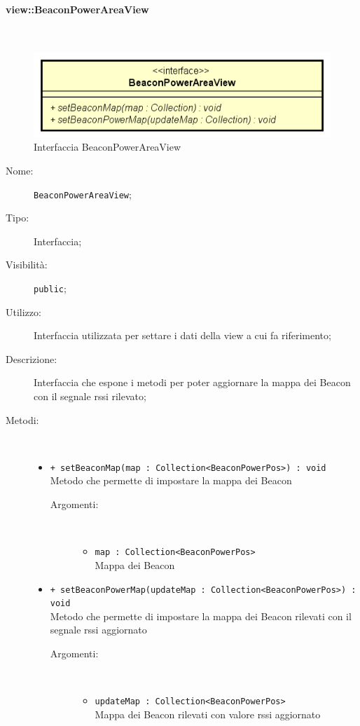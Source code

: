 \documentclass[../DefinizioneDiProdotto.tex]{subfiles}
\begin{document}
\paragraph{view::BeaconPowerAreaView}
\
\begin{figure}[H]
	\centering
	\includegraphics[width=\maxwidth]{img/BeaconPowerAreaView.png}
	\caption{Interfaccia BeaconPowerAreaView}\label{fig:view::BeaconPowerAreaView} 
\end{figure}
\begin{description}
	\item[Nome:] \texttt{BeaconPowerAreaView};
	\item[Tipo:] Interfaccia;
	\item[Visibilità:] \texttt{public};
	\item[Utilizzo:] Interfaccia utilizzata per settare i dati della view a cui fa riferimento;
	\item[Descrizione:] Interfaccia che espone i metodi per poter aggiornare la mappa dei Beacon con il segnale rssi rilevato;
	\item[Metodi:] \
	\begin{itemize}
		\item \texttt{+ setBeaconMap(map : Collection<BeaconPowerPos>) : void}\\
		Metodo che permette di impostare la mappa dei Beacon
		\begin{description}
			\item[Argomenti:] \
			\begin{itemize}
				\item \texttt{map : Collection<BeaconPowerPos>}\\
				Mappa dei Beacon\end{itemize}
		\end{description}
		\item \texttt{+ setBeaconPowerMap(updateMap : Collection<BeaconPowerPos>) : void}\\
		Metodo che permette di impostare la mappa dei Beacon rilevati con il segnale rssi aggiornato
		\begin{description}
			\item[Argomenti:] \
			\begin{itemize}
				\item \texttt{updateMap : Collection<BeaconPowerPos>}\\
				Mappa dei Beacon rilevati con valore rssi aggiornato\end{itemize}
		\end{description}
	\end{itemize}
\end{description}
\end{document}
